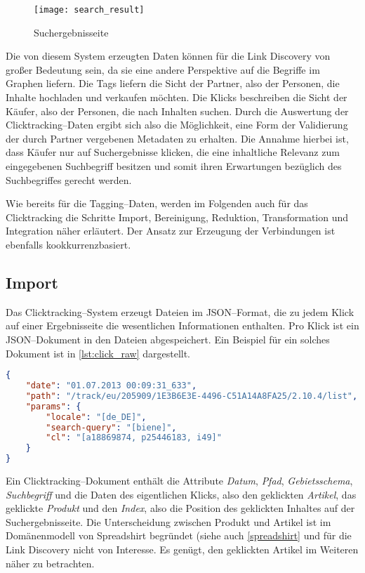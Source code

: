 \begin{figure}
\centering
\texttt{[image: search\_result]}
\caption{Suchergebnisseite}
\label{fig:search_result}
\end{figure}

Die von diesem System erzeugten Daten können für die Link Discovery von großer Bedeutung sein, da sie eine andere Perspektive auf die Begriffe im Graphen liefern. Die Tags liefern die Sicht der Partner, also der Personen, die Inhalte hochladen und verkaufen möchten. Die Klicks beschreiben die Sicht der Käufer, also der Personen, die nach Inhalten suchen. Durch die Auswertung der Clicktracking--Daten ergibt sich also die Möglichkeit, eine Form der Validierung der durch Partner vergebenen Metadaten zu erhalten. Die Annahme hierbei ist, dass Käufer nur auf Suchergebnisse klicken, die eine inhaltliche Relevanz zum eingegebenen Suchbegriff besitzen und somit ihren Erwartungen bezüglich des Suchbegriffes gerecht werden.

Wie bereits für die Tagging--Daten, werden im Folgenden auch für das Clicktracking die Schritte Import, Bereinigung, Reduktion, Transformation und Integration näher erläutert. Der Ansatz zur Erzeugung der Verbindungen ist ebenfalls kookkurrenzbasiert.

\subsection{Import}
\label{click_import}

Das Clicktracking--System erzeugt Dateien im JSON--Format, die zu jedem Klick auf einer Ergebnisseite die wesentlichen Informationen enthalten. Pro Klick ist ein JSON--Dokument in den Dateien abgespeichert. Ein Beispiel für ein solches Dokument ist in \cref{lst:click_raw} dargestellt.

\begin{lstlisting}[language=json, label={lst:click_raw}, caption={Clicktracking - Rohdokument als JSON}]
{
    "date": "01.07.2013 00:09:31_633",
    "path": "/track/eu/205909/1E3B6E3E-4496-C51A14A8FA25/2.10.4/list",
    "params": {
        "locale": "[de_DE]",
        "search-query": "[biene]",
        "cl": "[a18869874, p25446183, i49]"
    }
}
\end{lstlisting}

Ein Clicktracking--Dokument enthält die Attribute \emph{Datum}, \emph{Pfad}, \emph{Gebietsschema}, \emph{Suchbegriff} und die Daten des eigentlichen Klicks, also den geklickten \emph{Artikel}, das geklickte \emph{Produkt} und den \emph{Index}, also die Position des geklickten Inhaltes auf der Suchergebnisseite. Die Unterscheidung zwischen Produkt und Artikel ist im Domänenmodell von Spreadshirt begründet (siehe auch \cref{spreadshirt} und für die Link Discovery nicht von Interesse. Es genügt, den geklickten Artikel im Weiteren näher zu betrachten.

